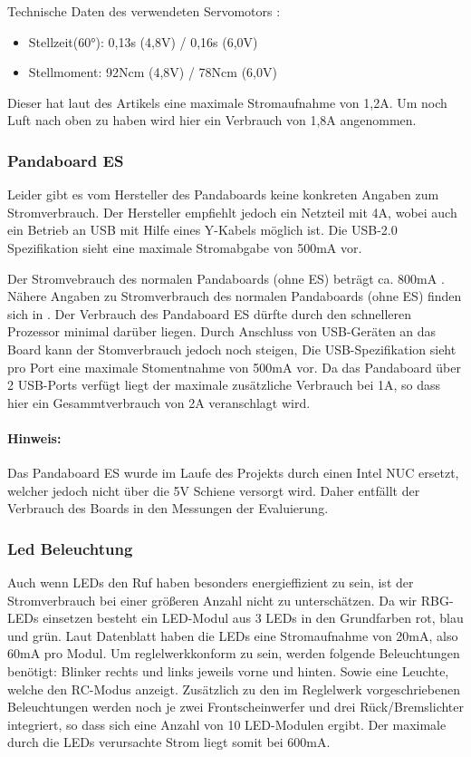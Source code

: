 Technische Daten des verwendeten Servomotors \cite{website-servo-dat}:
\begin{itemize}
 \item Stellzeit(60°): 0,13s (4,8V) / 0,16s (6,0V)
 \item Stellmoment: 92Ncm (4,8V) / 78Ncm (6,0V)
\end{itemize}



Dieser hat laut des Artikels eine maximale Stromaufnahme von 1,2A. Um noch Luft nach oben zu haben wird hier ein Verbrauch von 
1,8A angenommen.

\subsubsection{Pandaboard ES}
Leider gibt es vom Hersteller des Pandaboards keine konkreten Angaben zum Stromverbrauch. Der Hersteller empfiehlt jedoch ein
Netzteil mit 4A\cite{website-panda-supply}, wobei auch ein Betrieb an USB mit Hilfe eines Y-Kabels möglich ist. Die USB-2.0 Spezifikation\cite{website-usb-spec} sieht eine maximale 
Stromabgabe von 500mA vor.

Der Stromvebrauch des normalen Pandaboards (ohne ES) beträgt ca. 800mA \cite{website-panda-power}.
Nähere Angaben zu Stromverbrauch des normalen Pandaboards (ohne ES) finden sich in \cite{website-panda-power}.
Der Verbrauch des Pandaboard ES dürfte durch den schnelleren Prozessor minimal darüber liegen. 
Durch Anschluss von USB-Geräten an das Board kann der Stomverbrauch jedoch noch steigen, Die USB-Spezifikation \cite{website-usb-spec}
sieht pro Port eine maximale Stomentnahme von 500mA vor. Da das Pandaboard über 2 USB-Ports verfügt liegt der maximale zusätzliche Verbrauch bei 1A,
so dass hier ein Gesammtverbrauch von 2A veranschlagt wird.

\paragraph{Hinweis:}
Das Pandaboard ES wurde im Laufe des Projekts durch einen Intel NUC ersetzt, welcher jedoch nicht über die 5V Schiene versorgt wird.
Daher entfällt der Verbrauch des Boards in den Messungen der Evaluierung.

\subsubsection{Led Beleuchtung}
Auch wenn LEDs den Ruf haben besonders energieffizient zu sein, ist der Stromverbrauch bei einer größeren Anzahl nicht zu
unterschätzen. Da wir RBG-LEDs einsetzen besteht ein LED-Modul aus 3 LEDs in den Grundfarben rot, blau und grün.
Laut Datenblatt \cite{ds-WS2812} haben die LEDs eine Stromaufnahme von 20mA, also 60mA pro Modul.
Um reglelwerkkonform zu sein, werden folgende Beleuchtungen benötigt: Blinker rechts und links jeweils vorne und hinten.
Sowie eine Leuchte, welche den RC-Modus anzeigt. Zusätzlich zu den im Reglelwerk vorgeschriebenen Beleuchtungen werden noch je
zwei Frontscheinwerfer und drei Rück/Bremslichter integriert, so dass sich eine Anzahl von 10 LED-Modulen ergibt.
Der maximale durch die LEDs verursachte Strom liegt somit bei 600mA. 


